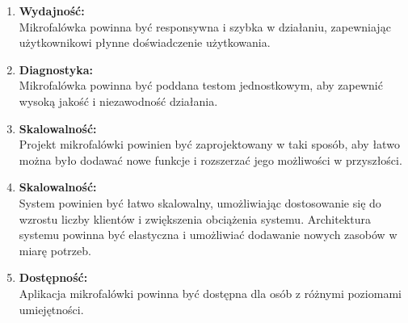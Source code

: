 \begin{enumerate}
    \item \textbf{Wydajność:} \\
    Mikrofalówka powinna być responsywna i szybka w działaniu, zapewniając użytkownikowi płynne doświadczenie użytkowania.
    
    \item \textbf{Diagnostyka:} \\
    Mikrofalówka powinna być poddana testom jednostkowym, aby zapewnić wysoką jakość i niezawodność działania.
    
    \item \textbf{Skalowalność:} \\
    Projekt mikrofalówki powinien być zaprojektowany w taki sposób, aby łatwo można było dodawać nowe funkcje i rozszerzać jego możliwości w przyszłości.
    
    \item \textbf{Skalowalność:} \\
    System powinien być łatwo skalowalny, umożliwiając dostosowanie się do wzrostu liczby klientów i zwiększenia obciążenia systemu. Architektura systemu powinna być elastyczna i umożliwiać dodawanie nowych zasobów w miarę potrzeb.
    
    \item \textbf{Dostępność:} \\
    Aplikacja mikrofalówki powinna być dostępna dla osób z różnymi poziomami umiejętności.
    
\end{enumerate}



